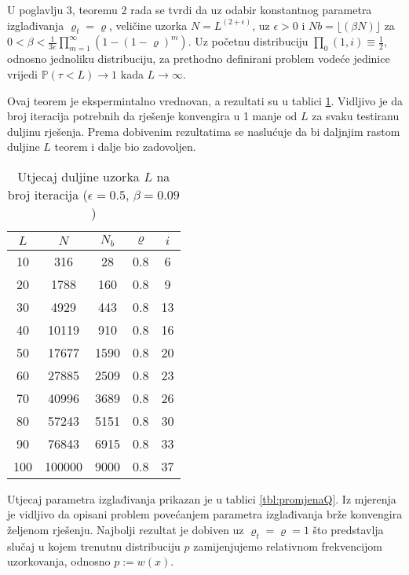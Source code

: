\documentclass[times, utf8, zavrsni]{fer}
\newcommand{\floor}[1]{\lfloor #1 \rfloor}
\begin{document}
U poglavlju 3, teoremu 2 rada \citep{zijun2014asymptotic} se tvrdi da uz odabir konstantnog parametra izglađivanja $\varrho_t = \varrho$, veličine uzorka $N = L^{(2 + \epsilon)}$, uz $\epsilon > 0$ i
$Nb =  \floor{(\beta N)}$ za $0 < \beta < \frac{1}{3e} \prod^{\infty}_{m=1} (1 - (1 - \varrho)^m)$. Uz početnu distribuciju
$\prod_0(1, i) \equiv \frac{1}{2}$, odnosno jednoliku distribuciju, za prethodno definirani
problem vodeće jedinice vrijedi $\mathbb{P}(\tau < L) \rightarrow 1$ kada $L \rightarrow \infty$.

Ovaj teorem je ekspermintalno vrednovan, a rezultati su u tablici \ref{tbl:promjenaL}. Vidljivo je da broj iteracija potrebnih da rješenje
konvengira u 1 manje od $L$ za svaku testiranu duljinu rješenja. Prema dobivenim rezultatima se naslućuje da bi daljnjim rastom duljine $L$
teorem i dalje bio zadovoljen.
\begin{table}[h!]
  \caption{Utjecaj duljine uzorka $L$ na broj iteracija ($\epsilon = 0.5$, $\beta = 0.09$)}
  \label{tbl:promjenaL}
  \centering
  \begin{tabular}{c | c | c | c | c}
    $L$ & $N$ & $N_b$ & $\varrho$ & $i$ \\ \hline
    10 & 316 & 28 & 0.8 & 6 \\ \hline
    20 & 1788 & 160 & 0.8 & 9 \\ \hline
    30 & 4929 & 443 & 0.8 & 13 \\ \hline
    40 & 10119 & 910 & 0.8 & 16 \\ \hline
    50 & 17677 & 1590 & 0.8 & 20 \\ \hline
    60 & 27885 & 2509 & 0.8 & 23 \\ \hline
    70 & 40996 & 3689 & 0.8 & 26 \\ \hline
    80 & 57243 & 5151 & 0.8 & 30 \\ \hline
    90 & 76843 & 6915 & 0.8 & 33 \\ \hline
    100 & 100000 & 9000 & 0.8 & 37
  \end{tabular}
\end{table}



Utjecaj parametra izglađivanja prikazan je u tablici \ref{tbl:promjenaQ}. Iz mjerenja je vidljivo da opisani problem povećanjem parametra izglađivanja
brže konvengira željenom rješenju. Najbolji rezultat je dobiven uz $\varrho_t = \varrho = 1$ što predstavlja slučaj u kojem trenutnu distribuciju
$p$ zamijenjujemo relativnom frekvencijom uzorkovanja, odnosno $p := w(x)$.
\end{document}
